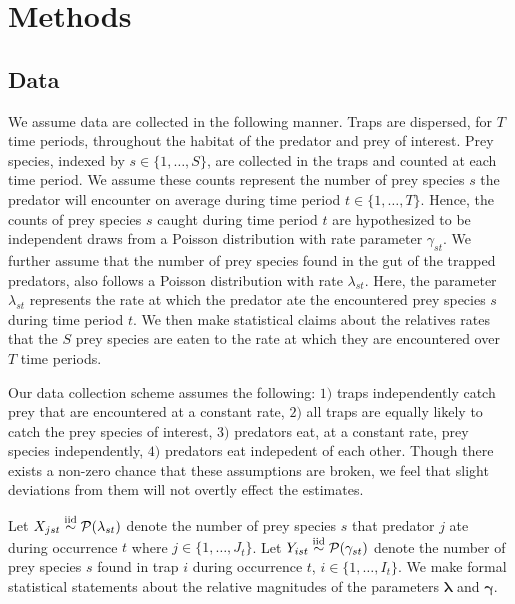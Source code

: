 \section*{Methods}
\label{sec:methods}

\subsection*{Data}

We assume data are collected in the following manner.  Traps are dispersed, for $T$ time periods, throughout the habitat of the predator and prey of interest.  Prey species, indexed by $s \in \{1, \ldots, S \}$, are collected in the traps and counted at each time period.  We assume these counts represent the number of prey species $s$ the predator will encounter on average during time period $t \in \{1, \ldots, T\}$.  Hence, the counts of prey species $s$ caught during time period $t$ are hypothesized to be independent draws from a Poisson distribution with rate parameter $\gamma_{st}$.  We further assume that the number of prey species found in the gut of the trapped predators, also follows a Poisson distribution with rate $\lambda_{st}$.  Here, the parameter $\lambda_{st}$ represents the rate at which the predator ate the encountered prey species $s$ during time period $t$.  We then make statistical claims about the relatives rates that the $S$ prey species are eaten to the rate at which they are encountered over $T$ time periods.  

Our data collection scheme assumes the following: $1)$ traps independently catch prey that are encountered at a constant rate, $2)$ all traps are equally likely to catch the prey species of interest, $3)$ predators eat, at a constant rate, prey species independently, $4)$ predators eat indepedent of each other.  Though there exists a non-zero chance that these assumptions are broken, we feel that slight deviations from them will not overtly effect the estimates.  

Let $X_{jst} \stackrel{\mathrm{iid}}{\sim} \mathcal{P}(\lambda_{st})$ denote the number of prey species $s$ that predator $j$ ate during occurrence $t$ where $j \in \{1, \ldots, J_t\}$.  Let $Y_{ist} \stackrel{\mathrm{iid}}{\sim} \mathcal{P}(\gamma_{st})$ denote the number of prey species $s$ found in trap $i$ during occurrence $t$, $i \in \{1, \ldots, I_t\}$.  We make formal statistical statements about the relative magnitudes of the parameters $\boldsymbol{\lambda}$ and $\boldsymbol{\gamma}$.  

